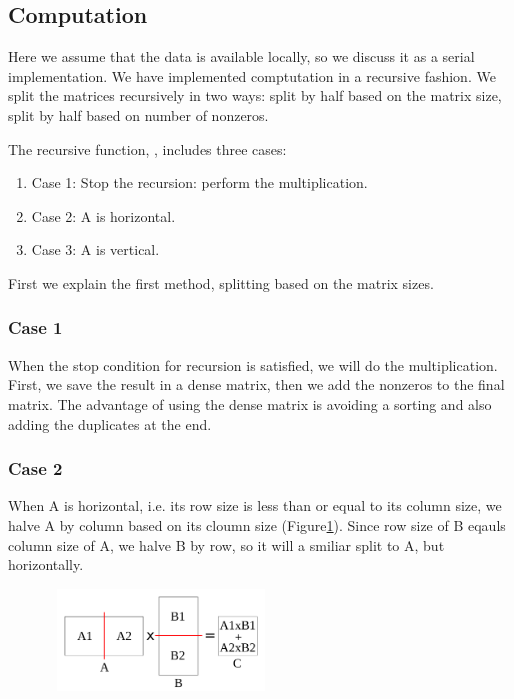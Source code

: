 \subsection{Computation}
\label{sec:comp}
Here we assume that the data is available locally, so we discuss it as a serial implementation. We have implemented comptutation in a recursive fashion. We split the matrices recursively in two ways: split by half based on the matrix size, split by half based on number of nonzeros. 

The recursive function, \recmm, includes three cases:
\begin{enumerate}
 \item Case 1: Stop the recursion: perform the multiplication.
 \item Case 2: A is horizontal.
 \item Case 3: A is vertical.
\end{enumerate}

First we explain the first method, splitting based on the matrix sizes.

\subsubsection{Case 1}
\label{sec:case1}
When the stop condition for recursion is satisfied, we will do the multiplication. 
First, we save the result in a dense matrix, then we add the nonzeros to the final matrix. The advantage of using the dense matrix is avoiding a sorting and also adding the duplicates at the end.

\subsubsection{Case 2}
\label{sec:case2}
When A is horizontal, i.e. its row size is less than or equal to its column size, we halve A by column based on its cloumn size (Figure\ref{fig:case2}). Since row size of B eqauls column size of A, we halve B by row, so it will a smiliar split to A, but horizontally.

\begin{figure}[tbh]
 \centering
 \includegraphics[width=6cm,height=2.7cm]{./figures/case2_001.pdf}
 \caption{}
 \label{fig:case2}
\end{figure}

